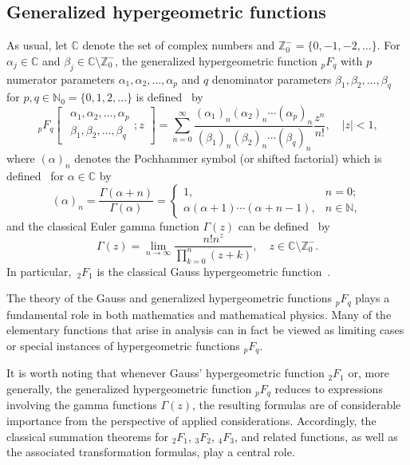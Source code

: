 \documentclass[reqno]{amsart}
\numberwithin{equation}{section}
\theoremstyle{plain}
\theoremstyle{remark}
\begin{document}
\subsection{Generalized hypergeometric functions}
As usual, let $\mathbb{C}$ denote the set of complex numbers and $\mathbb{Z}_0^-=\{0, -1, -2, \dotsc\}$. For $\alpha_j \in \mathbb{C}$ and $\beta_j \in \mathbb{C} \setminus \mathbb{Z}_0^-$, the generalized hypergeometric function ${}_pF_q$ with $p$ numerator parameters $\alpha_1,\alpha_2, \dotsc, \alpha_p$ and $q$ denominator parameters $\beta_1, \beta_2,\dotsc, \beta_q$ for $p, q \in \mathbb{N}_0= \{0,1,2,\dotsc\}$ is defined~\cite{23} by
\begin{equation*}
{\,}_pF_q\begin{bmatrix}\begin{matrix}
\alpha_1, \alpha_2,\dotsc, \alpha_p\\
\beta_1, \beta_2,\dotsc, \beta_q
\end{matrix};z\end{bmatrix}
= \sum_{n=0}^{\infty}
\frac{(\alpha_1)_n (\alpha_2)_n \cdots (\alpha_p)_n}
{(\beta_1)_n (\beta_2)_n \cdots (\beta_q)_n}
\frac{z^n}{n!},\quad |z|<1,
\end{equation*}
where $(\alpha)_n$ denotes the Pochhammer symbol (or shifted factorial) which is defined~\cite[p.~72]{Temme-96-book} for $\alpha \in \mathbb{C}$ by
\[
(\alpha)_n=\frac{\Gamma(\alpha+n)}{\Gamma(\alpha)} =
\begin{cases}
1, & n=0;\\
\alpha(\alpha+1)\cdots(\alpha+n - 1), & n \in \mathbb{N},
\end{cases}
\]
and the classical Euler gamma function $\Gamma(z)$ can be defined~\cite[Chapter~3]{Temme-96-book} by
\begin{equation*}
\Gamma(z)=\lim_{n\to\infty}\frac{n!n^z}{\prod_{k=0}^n(z+k)}, \quad z\in\mathbb{C}\setminus\mathbb{Z}_0^-.
\end{equation*}
In particular, ${\,}_2F_1$ is the classical Gauss hypergeometric function~\cite[Chapter~5]{Temme-96-book}.
\par
The theory of the Gauss and generalized hypergeometric functions ${}_pF_q$ plays a fundamental role in both mathematics and mathematical physics. Many of the elementary functions that arise in analysis can in fact be viewed as limiting cases or special instances of hypergeometric functions ${}_pF_q$.
\par
It is worth noting that whenever Gauss' hypergeometric function ${}_2F_1$ or, more generally, the generalized hypergeometric function ${}_pF_q$ reduces to expressions involving the gamma functions $\Gamma(z)$, the resulting formulas are of considerable importance from the perspective of applied considerations. Accordingly, the classical summation theorems for ${}_2F_1$, ${}_3F_2$, ${}_4F_3$, and related functions, as well as the associated transformation formulas, play a central role. 
\end{document}
